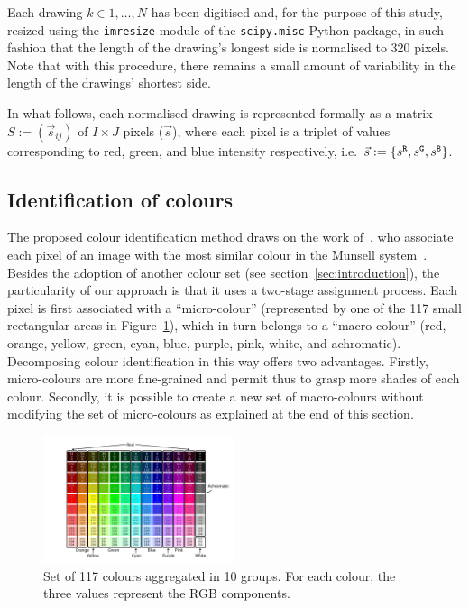 \documentclass[11pt,a4paper]{article}
\begin{document}
Each drawing $k \in 1,\dots, N$ has been digitised and, for the purpose of this study, resized using the {\tt imresize} module of the {\tt scipy.misc} Python package, in such fashion that the length of the drawing's longest side is normalised to 320 pixels. Note that with this procedure, there remains a small amount of variability in the length of the drawings' shortest side. 

In what follows, each normalised drawing is represented formally as a matrix $S := (\vec{s}_{ij})$ of $I \times J$ pixels ($\vec{s}$), where each pixel is a triplet of values corresponding to red, green, and blue intensity respectively, i.e.~$\vec{s} := \{ s^{\tt \scriptstyle R}, s^{\tt \scriptstyle G}, s^{\tt \scriptstyle B} \}$.

\subsection{Identification of colours}
\label{sec:identification}

The proposed colour identification method draws on the work of~\citet{kimbaelee2007}, who associate each pixel of an image with the most similar colour in the Munsell system~\cite{Munsell1912}. 
Besides the adoption of another colour set (see section~\ref{sec:introduction}), the particularity of our approach is that it uses a two-stage assignment process. Each pixel is first associated with a ``micro-colour'' (represented by one of the 117 small rectangular areas in Figure~\ref{fig:colour_set}), which in turn belongs to a ``macro-colour'' (red, orange, yellow, green, cyan, blue, purple, pink, white, and achromatic). Decomposing colour identification in this way offers two advantages. Firstly, micro-colours are more fine-grained and permit thus to grasp more shades of each colour.  Secondly, it is possible to create a new set of macro-colours without modifying the set of micro-colours as explained at the end of this section.

\begin{figure}
	\centering
	\includegraphics[width=0.5\textwidth]{figures/Col_tab.pdf}
	\caption{Set of 117 colours aggregated in 10 groups. For each colour, the three values represent the RGB components. \label{fig:colour_set}}
\end{figure}
\end{document}
